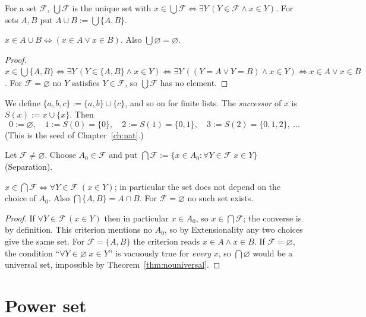 \begin{definition}[Union]
	For a set $\mathcal F$, $\bigcup\mathcal F$ is the unique set with $x\in\bigcup\mathcal F\iff\exists Y\,(Y\in\mathcal F\wedge x\in Y)$. For sets $A,B$ put $A\cup B:=\bigcup\{A,B\}$.
\end{definition}

\begin{proposition}\label{prop:binunion}
	$x\in A\cup B\iff(x\in A\vee x\in B)$. Also $\bigcup\varnothing=\varnothing$.
\end{proposition}
\begin{proof}
	$x\in\bigcup\{A,B\}\iff\exists Y\,(Y\in\{A,B\}\wedge x\in Y)\iff\exists Y\,((Y=A\vee Y=B)\wedge x\in Y)\iff x\in A\vee x\in B$. For $\mathcal F=\varnothing$ no $Y$ satisfies $Y\in\mathcal F$, so $\bigcup\mathcal F$ has no element.
\end{proof}

We define $\{a,b,c\}:=\{a,b\}\cup\{c\}$, and so on for finite lists. The \emph{successor} of $x$ is $S(x):=x\cup\{x\}$. Then
\[
0:=\varnothing,\quad 1:=S(0)=\{0\},\quad 2:=S(1)=\{0,1\},\quad 3:=S(2)=\{0,1,2\},\ \dots
\]
(This is the seed of Chapter~\ref{ch:nat}.)

\begin{definition}\label{def:bigcap}
	Let $\mathcal F\ne\varnothing$. Choose $A_0\in\mathcal F$ and put $\bigcap\mathcal F:=\{x\in A_0:\forall Y\in\mathcal F\;x\in Y\}$ (Separation).
\end{definition}

\begin{proposition}
	$x\in\bigcap\mathcal F\iff\forall Y\in\mathcal F\;(x\in Y)$; in particular the set does not depend on the choice of $A_0$. Also $\bigcap\{A,B\}=A\cap B$. For $\mathcal F=\varnothing$ no such set exists.
\end{proposition}
\begin{proof}
	If $\forall Y\in\mathcal F\,(x\in Y)$ then in particular $x\in A_0$, so $x\in\bigcap\mathcal F$; the converse is by definition. This criterion mentions no $A_0$, so by Extensionality any two choices give the same set. For $\mathcal F=\{A,B\}$ the criterion reads $x\in A\wedge x\in B$. If $\mathcal F=\varnothing$, the condition ``$\forall Y\in\varnothing\;x\in Y$'' is vacuously true for \emph{every} $x$, so $\bigcap\varnothing$ would be a universal set, impossible by Theorem~\ref{thm:nouniversal}.
\end{proof}

\section{Power set}


